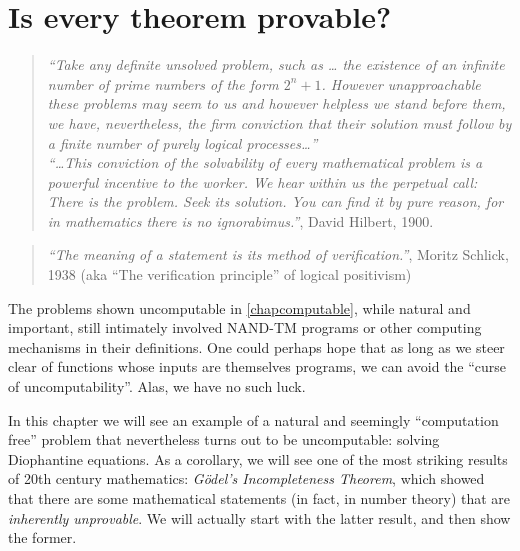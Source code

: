 \chapter{Is every theorem provable?}\label{godelchap}


\begin{quote}
\emph{``Take any definite unsolved problem, such as \ldots{} the
existence of an infinite number of prime numbers of the form
\(2^n + 1\). However unapproachable these problems may seem to us and
however helpless we stand before them, we have, nevertheless, the firm
conviction that their solution must follow by a finite number of purely
logical processes\ldots{}''}\\
\emph{``\ldots This conviction of the solvability of every mathematical
problem is a powerful incentive to the worker. We hear within us the
perpetual call: There is the problem. Seek its solution. You can find it
by pure reason, for in mathematics there is no ignorabimus.''}, David
Hilbert, 1900.
\end{quote}

\begin{quote}
\emph{``The meaning of a statement is its method of verification.''},
Moritz Schlick, 1938 (aka ``The verification principle'' of logical
positivism)
\end{quote}

The problems shown uncomputable in \cref{chapcomputable}, while natural
and important, still intimately involved NAND-TM programs or other
computing mechanisms in their definitions. One could perhaps hope that
as long as we steer clear of functions whose inputs are themselves
programs, we can avoid the ``curse of uncomputability''. Alas, we have
no such luck.

In this chapter we will see an example of a natural and seemingly
``computation free'' problem that nevertheless turns out to be
uncomputable: solving Diophantine equations. As a corollary, we will see
one of the most striking results of 20th century mathematics:
\emph{Gödel's Incompleteness Theorem}, which showed that there are some
mathematical statements (in fact, in number theory) that are
\emph{inherently unprovable}. We will actually start with the latter
result, and then show the former.


